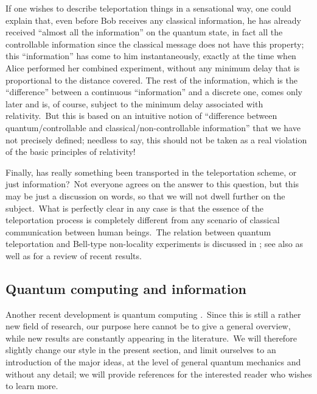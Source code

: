 \documentclass[12pt,onecolumn]{article}%
\begin{document}
If one wishes to describe teleportation things in a sensational way, one could
explain that, even before Bob receives any classical information, he has
already received ``almost all the information'' on the quantum state, in fact
all the controllable information since the classical message does not have
this property; this ``information'' has come to him instantaneously, exactly
at the time when Alice performed her combined experiment, without any minimum
delay that is proportional to the distance covered. The rest of the
information, which is the ``difference'' between a continuous ``information''
and a discrete one, comes only later and is, of course, subject to the minimum
delay associated with relativity.\ But this is based on an intuitive notion of
``difference between quantum/controllable and classical/non-controllable
information'' that we have not precisely defined; needless to say, this should
not be taken as a real violation of the basic principles of relativity!

Finally, has really something been transported in the teleportation scheme, or
just information?\ Not everyone agrees on the answer to this question, but
this may be just a discussion on words, so that we will not dwell further on
the subject.\ What is perfectly clear in any case is that the essence of the
teleportation process is completely different from any scenario of classical
communication between human beings.\ The relation between quantum
teleportation and Bell-type non-locality experiments is discussed in
\cite{Popescu}; see also \cite{Sudbury} as well as \cite{Physics-Today} for a
review of recent results.

\subsection{Quantum computing and information}

Another recent development is quantum computing \cite{C-H-Bennett}
\cite{Vicenzo} \cite{les2}.\ Since this is still a rather new field of
research, our purpose here cannot be to give a general overview, while new
results are constantly appearing in the literature.\ We will therefore
slightly change our style in the present section, and limit ourselves to an
introduction of the major ideas, at the level of general quantum mechanics and
without any detail; we will provide references for the interested reader who
wishes to learn more.
\end{document}
